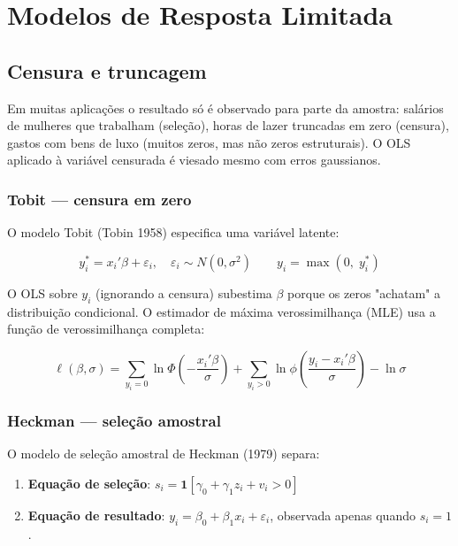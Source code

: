 \chapter{Modelos de Resposta Limitada}
\label{cap:limitada}

\section{Censura e truncagem}

Em muitas aplicações o resultado só é observado para parte da amostra:
salários de mulheres que trabalham (seleção), horas de lazer truncadas em
zero (censura), gastos com bens de luxo (muitos zeros, mas não zeros
estruturais). O OLS aplicado à variável censurada é viesado mesmo com erros
gaussianos.

\subsection*{Tobit — censura em zero}

O modelo Tobit (Tobin 1958) especifica uma variável latente:

\[
  y_i^* = x_i'\beta + \varepsilon_i, \quad \varepsilon_i \sim N(0,\sigma^2)
  \qquad
  y_i = \max(0,\; y_i^*)
\]

O OLS sobre $y_i$ (ignorando a censura) subestima $\beta$ porque os zeros
"achatam" a distribuição condicional. O estimador de máxima verossimilhança
(MLE) usa a função de verossimilhança completa:

\[
  \ell(\beta,\sigma) = \sum_{y_i=0} \ln\Phi\!\left(-\frac{x_i'\beta}{\sigma}\right)
  + \sum_{y_i>0} \ln\phi\!\left(\frac{y_i - x_i'\beta}{\sigma}\right) - \ln\sigma
\]

\subsection*{Heckman — seleção amostral}

O modelo de seleção amostral de Heckman (1979) separa:
\begin{enumerate}
  \item \textbf{Equação de seleção}: $s_i = \mathbf{1}[\gamma_0 + \gamma_1 z_i + v_i > 0]$
  \item \textbf{Equação de resultado}: $y_i = \beta_0 + \beta_1 x_i + \varepsilon_i$,
  observada apenas quando $s_i = 1$.
\end{enumerate}

